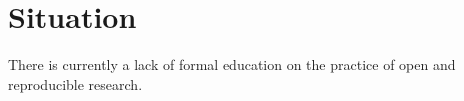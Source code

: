 \documentclass[12pt,letterpaper]{article}
\title{\ruleline{Logic Model}}
\begin{document}
\maketitle




\section{Situation}


There is currently a lack of formal education on the practice of open and reproducible research.  



\end{document}
